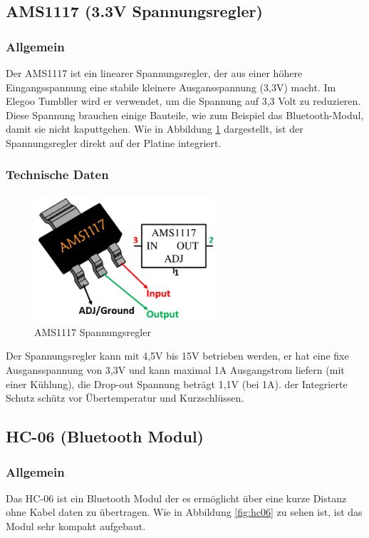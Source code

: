 \subsection{AMS1117 (3.3V Spannungsregler)}
%
\subsubsection{Allgemein}
Der AMS1117 ist ein linearer Spannungsregler,
der aus einer höhere Eingangsspannung eine stabile kleinere Ausgansspannung (3,3V) macht.
%
Im Elegoo Tumbller wird er verwendet,
um die Spannung auf 3,3 Volt zu reduzieren.
%
Diese Spannung brauchen einige Bauteile,
wie zum Beispiel das Bluetooth-Modul,
damit sie nicht kaputtgehen.
%
Wie in Abbildung \ref{fig:ams1117} dargestellt,
ist der Spannungsregler direkt auf der Platine integriert.
\subsubsection{Technische Daten}
\begin{figure}[H]
    \centering
    \includegraphics[width=0.6\textwidth]{img/Hardware/AMS1117.png}
    \caption{AMS1117 Spannungsregler}
    \label{fig:ams1117}
\end{figure}
Der Spannungsregler kann mit 4,5V bis 15V betrieben werden,
er hat eine fixe Ausgansspannung von 3,3V und kann maximal 1A Ausgangstrom liefern (mit einer Kühlung),
die Drop-out Spannung beträgt 1,1V (bei 1A). der Integrierte Schutz schütz vor Übertemperatur und Kurzschlüssen.
%
\subsection{HC-06 (Bluetooth Modul)}
%
\subsubsection{Allgemein}
Das HC-06 ist ein Bluetooth Modul der es ermöglicht über eine kurze Distanz ohne Kabel daten zu übertragen.
%
Wie in Abbildung \ref{fig:hc06} zu sehen ist,
ist das Modul sehr kompakt aufgebaut.
